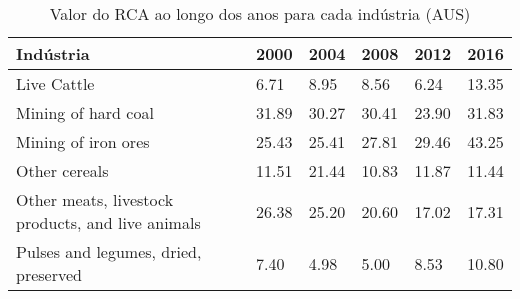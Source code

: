 \begin{table}
\centering
\caption{Valor do RCA ao longo dos anos para cada indústria (AUS)}
\begin{tabular}{p{6cm}p{1.5cm}p{1.5cm}p{1.5cm}p{1.5cm}p{1.5cm}}
\toprule
                                        Indústria &  2000 &  2004 &  2008 &  2012 &  2016 \\
\midrule
                                      Live Cattle &  6.71 &  8.95 &  8.56 &  6.24 & 13.35 \\
                              Mining of hard coal & 31.89 & 30.27 & 30.41 & 23.90 & 31.83 \\
                              Mining of iron ores & 25.43 & 25.41 & 27.81 & 29.46 & 43.25 \\
                                    Other cereals & 11.51 & 21.44 & 10.83 & 11.87 & 11.44 \\
Other meats, livestock products, and live animals & 26.38 & 25.20 & 20.60 & 17.02 & 17.31 \\
             Pulses and legumes, dried, preserved &  7.40 &  4.98 &  5.00 &  8.53 & 10.80 \\
\bottomrule
\end{tabular}
\end{table}
